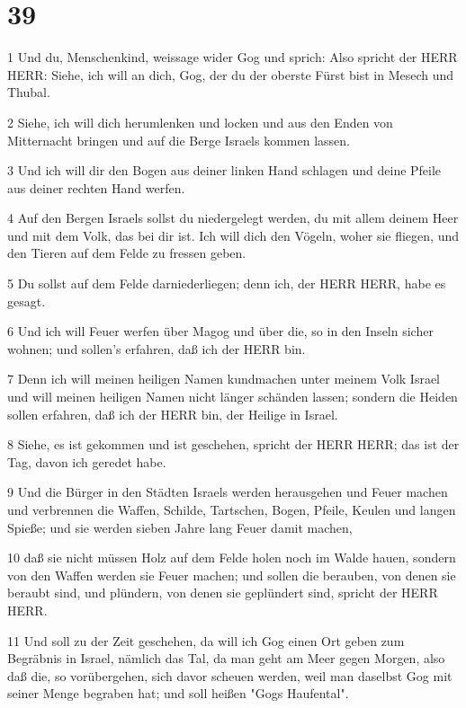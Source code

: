 \chapter{39}

\par 1 Und du, Menschenkind, weissage wider Gog und sprich: Also spricht der HERR HERR: Siehe, ich will an dich, Gog, der du der oberste Fürst bist in Mesech und Thubal.
\par 2 Siehe, ich will dich herumlenken und locken und aus den Enden von Mitternacht bringen und auf die Berge Israels kommen lassen.
\par 3 Und ich will dir den Bogen aus deiner linken Hand schlagen und deine Pfeile aus deiner rechten Hand werfen.
\par 4 Auf den Bergen Israels sollst du niedergelegt werden, du mit allem deinem Heer und mit dem Volk, das bei dir ist. Ich will dich den Vögeln, woher sie fliegen, und den Tieren auf dem Felde zu fressen geben.
\par 5 Du sollst auf dem Felde darniederliegen; denn ich, der HERR HERR, habe es gesagt.
\par 6 Und ich will Feuer werfen über Magog und über die, so in den Inseln sicher wohnen; und sollen's erfahren, daß ich der HERR bin.
\par 7 Denn ich will meinen heiligen Namen kundmachen unter meinem Volk Israel und will meinen heiligen Namen nicht länger schänden lassen; sondern die Heiden sollen erfahren, daß ich der HERR bin, der Heilige in Israel.
\par 8 Siehe, es ist gekommen und ist geschehen, spricht der HERR HERR; das ist der Tag, davon ich geredet habe.
\par 9 Und die Bürger in den Städten Israels werden herausgehen und Feuer machen und verbrennen die Waffen, Schilde, Tartschen, Bogen, Pfeile, Keulen und langen Spieße; und sie werden sieben Jahre lang Feuer damit machen,
\par 10 daß sie nicht müssen Holz auf dem Felde holen noch im Walde hauen, sondern von den Waffen werden sie Feuer machen; und sollen die berauben, von denen sie beraubt sind, und plündern, von denen sie geplündert sind, spricht der HERR HERR.
\par 11 Und soll zu der Zeit geschehen, da will ich Gog einen Ort geben zum Begräbnis in Israel, nämlich das Tal, da man geht am Meer gegen Morgen, also daß die, so vorübergehen, sich davor scheuen werden, weil man daselbst Gog mit seiner Menge begraben hat; und soll heißen "Gogs Haufental".
